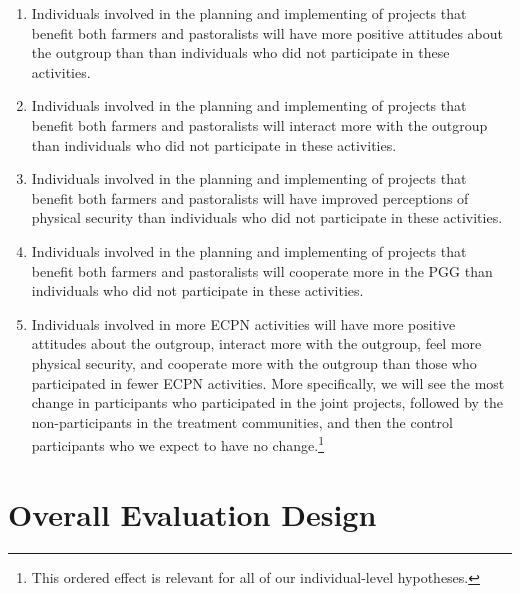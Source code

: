 \documentclass[
]{article}
\providecommand{\tightlist}{%
  \setlength{\itemsep}{0pt}\setlength{\parskip}{0pt}}
\begin{document}
\begin{enumerate}
\def\labelenumi{\arabic{enumi}.}
\tightlist
\item
  Individuals involved in the planning and implementing of projects that
  benefit both farmers and pastoralists will have more positive
  attitudes about the outgroup than than individuals who did not
  participate in these activities.
\item
  Individuals involved in the planning and implementing of projects that
  benefit both farmers and pastoralists will interact more with the
  outgroup than individuals who did not participate in these activities.
\item
  Individuals involved in the planning and implementing of projects that
  benefit both farmers and pastoralists will have improved perceptions
  of physical security than individuals who did not participate in these
  activities.
\item
  Individuals involved in the planning and implementing of projects that
  benefit both farmers and pastoralists will cooperate more in the PGG
  than individuals who did not participate in these activities.
\item
  Individuals involved in more ECPN activities will have more positive
  attitudes about the outgroup, interact more with the outgroup, feel
  more physical security, and cooperate more with the outgroup than
  those who participated in fewer ECPN activities. More specifically, we
  will see the most change in participants who participated in the joint
  projects, followed by the non-participants in the treatment
  communities, and then the control participants who we expect to have
  no change.\footnote{This ordered effect is relevant for all of our
    individual-level hypotheses.}
\end{enumerate}

\hypertarget{overall-evaluation-design}{%
\section{Overall Evaluation Design}\label{overall-evaluation-design}}
\end{document}
